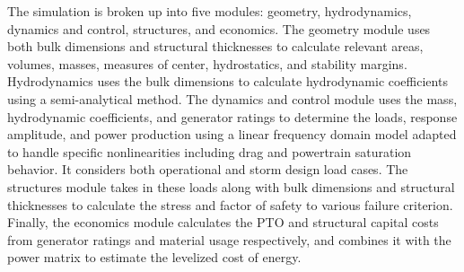 The simulation is broken up into five modules: geometry, hydrodynamics, dynamics and control, structures, and economics.
The geometry module uses both bulk dimensions and structural thicknesses to calculate relevant areas, volumes, masses, measures of center, hydrostatics, and stability margins.
Hydrodynamics uses the bulk dimensions to calculate hydrodynamic coefficients using a semi-analytical method.
The dynamics and control module uses the mass, hydrodynamic coefficients, and generator ratings to determine the loads, response amplitude, and power production using a linear frequency domain model adapted to handle specific nonlinearities including drag and powertrain saturation behavior.
It considers both operational and storm design load cases.
The structures module takes in these loads along with bulk dimensions and structural thicknesses to calculate the stress and factor of safety to various failure criterion.
Finally, the economics module calculates the PTO and structural capital costs from generator ratings and material usage respectively, and combines it with the power matrix to estimate the levelized cost of energy.

